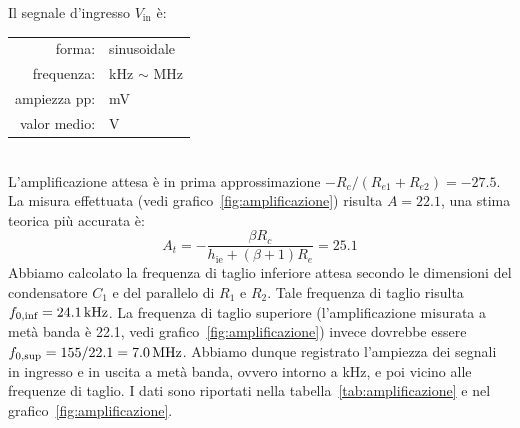 \documentclass[italian,a4paper]{article}
\begin{document}
Il segnale d'ingresso $V_{\text{in}}$ è:
\begin{table}[h]
    \centering
    \begin{tabular}{rl}
        forma: & sinusoidale\\
        frequenza: & \unit[20]{kHz} $\sim$ \unit[3]{MHz}\\
        ampiezza pp: & \unit[200]{mV}\\
        valor medio: & \unit[0]{V}
    \end{tabular}
\end{table}\\
L'amplificazione attesa è in prima approssimazione $-R_c/(R_{e1}+R_{e2}) =
-27.5$. La misura effettuata (vedi grafico~\ref{fig:amplificazione}) risulta
$A = 22.1$, una stima teorica più accurata è:
\begin{equation*}
    A_t = -\dfrac{\beta R_c}{h_{\text{ie}} + (\beta +1)R_e} = 25.1
\end{equation*}
Abbiamo calcolato la frequenza di taglio inferiore attesa secondo le
dimensioni del condensatore $C_1$ e del parallelo di $R_1$ e $R_2$. Tale
frequenza di taglio risulta $f_{0,\text{inf}} = \unit[24.1]{kHz}$. La
frequenza di taglio superiore (l'amplificazione misurata a metà banda è
22.1, vedi grafico~\ref{fig:amplificazione}) invece dovrebbe essere $f_{0,\text{sup}} =
155/22.1 = \unit[7.0]{MHz}$. Abbiamo dunque registrato l'ampiezza dei
segnali in ingresso e in uscita a metà banda, ovvero intorno a
\unit[500]{kHz}, e poi vicino alle frequenze di taglio. I dati sono
riportati nella tabella~\ref{tab:amplificazione} e nel
grafico~\ref{fig:amplificazione}.
\end{document}
